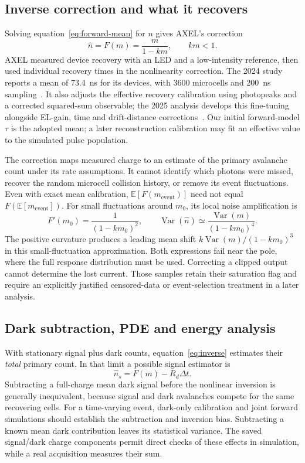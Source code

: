 \documentclass[11pt]{article}
\newcommand{\E}{\mathbb{E}}
\newcommand{\Var}{\operatorname{Var}}
\begin{document}
\subsection{Inverse correction and what it recovers}
Solving equation~\eqref{eq:forward-mean} for $n$ gives AXEL's correction
\begin{equation}
 \widehat n=F(m)=\frac{m}{1-km},\qquad km<1.
 \label{eq:inverse}
\end{equation}
AXEL measured device recovery with an LED and a low-intensity reference,
then used individual recovery times in the nonlinearity correction. The
2024 study reports a mean of 73.4~ns for its devices, with 3600 microcells
and 200~ns sampling~\cite{Yoshida2024AXELResponse}. It also adjusts the
effective recovery calibration using photopeaks and a corrected squared-sum
observable; the 2025 analysis develops this fine-tuning alongside EL-gain,
time and drift-distance corrections~\cite{Akiyama:2025dia}. Our initial
forward-model $\tau$ is the adopted mean; a later reconstruction calibration
may fit an effective value to the simulated pulse population.

The correction maps measured charge to an estimate of the primary avalanche
count under its rate assumptions. It cannot identify which photons were
missed, recover the random microcell collision history, or remove its event
fluctuations. Even with exact mean calibration,
$\E[F(m_{\mathrm{event}})]$ need not equal $F(\E[m_{\mathrm{event}}])$.
For small fluctuations around $m_0$, its local noise amplification is
\begin{equation}
 F'(m_0)=\frac{1}{(1-km_0)^2},\qquad
 \Var(\widehat n)\simeq\frac{\Var(m)}{(1-km_0)^4}.
 \label{eq:inverse-noise}
\end{equation}
The positive curvature produces a leading mean shift
$k\Var(m)/(1-km_0)^3$ in this small-fluctuation approximation. Both
expressions fail near the pole, where the full response distribution must be
used. Correcting a clipped output cannot determine the lost current. Those
samples retain their saturation flag and require an explicitly justified
censored-data or event-selection treatment in a later analysis.

\subsection{Dark subtraction, PDE and energy analysis}
With stationary signal plus dark counts, equation~\eqref{eq:inverse}
estimates their \emph{total} primary count. In that limit a possible signal
estimator is
\begin{equation}
 \widehat n_s=F(m)-R_d\Delta t.
 \label{eq:dark-subtraction}
\end{equation}
Subtracting a full-charge mean dark signal before the nonlinear inversion is
generally inequivalent, because signal and dark avalanches compete for the
same recovering cells. For a time-varying event, dark-only calibration and
joint forward simulations should establish the subtraction and inversion
bias. Subtracting a known mean dark contribution leaves its statistical
variance. The saved signal/dark charge components permit direct checks of
these effects in simulation, while a real acquisition measures their sum.
\end{document}
